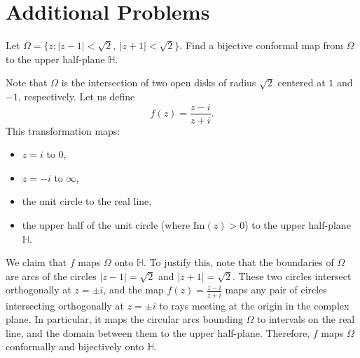 \documentclass[12pt]{article}
\begin{document}
\begin{statement}[8.5.17]
\end{statement}

\section{Additional Problems}

\begin{statement}[1]
    Let $\Omega = \{ z : |z - 1| < \sqrt{2},\ |z + 1| < \sqrt{2} \}$. Find a bijective conformal map from $\Omega$ to the upper half-plane $\mathbb{H}$.
\end{statement}
\begin{newproof}
    Note that $\Omega$ is the intersection of two open disks of radius $\sqrt{2}$ centered at $1$ and $-1$, respectively. Let us define
    $$ f(z) = \frac{z - i}{z + i}. $$
    This transformation maps:
    \begin{itemize}
        \item $z = i$ to $0$,
        \item $z = -i$ to $\infty$,
        \item the unit circle to the real line,
        \item the upper half of the unit circle (where $\text{Im}(z) > 0$) to the upper half-plane $\mathbb{H}$.
    \end{itemize}
    We claim that $f$ maps $\Omega$ onto $\mathbb{H}$. To justify this, note that the boundaries of $\Omega$ are arcs of the circles $|z - 1| = \sqrt{2}$ and $|z + 1| = \sqrt{2}$. These two circles intersect orthogonally at $z = \pm i$, and the map $f(z) = \frac{z - i}{z + i}$ maps any pair of circles intersecting orthogonally at $z = \pm i$ to rays meeting at the origin in the complex plane. In particular, it maps the circular arcs bounding $\Omega$ to intervals on the real line, and the domain between them to the upper half-plane. Therefore, $f$ maps $\Omega$ conformally and bijectively onto $\mathbb{H}$.
\end{newproof}
\end{document}
